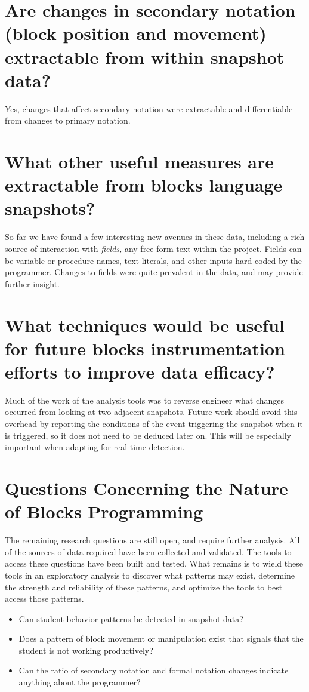 \section{Are changes in secondary notation (block position and movement) extractable from within snapshot data?}
Yes, changes that affect secondary notation were extractable and differentiable from changes to primary notation.

\section{What other useful measures are extractable from blocks language snapshots?}
So far we have found a few interesting new avenues in these data, including a rich source of interaction with \emph{fields,} any free-form text within the project. Fields can be variable or procedure names, text literals, and other inputs hard-coded by the programmer. Changes to fields were quite prevalent in the data, and may provide further insight.

\section{What techniques would be useful for future blocks instrumentation efforts to improve data efficacy?}
Much of the work of the analysis tools was to reverse engineer what changes occurred from looking at two adjacent snapshots. Future work should avoid this overhead by reporting the conditions of the event triggering the snapshot when it is triggered, so it does not need to be deduced later on. This will be especially important when adapting for real-time detection.

\section{Questions Concerning the Nature of Blocks Programming}
The remaining research questions are still open, and require further analysis. All of the sources of data required have been collected and validated. The tools to access these questions have been built and tested. What remains is to wield these tools in an exploratory analysis to discover what patterns may exist, determine the strength and reliability of these patterns, and optimize the tools to best access those patterns.
\begin{itemize}
\item Can student behavior patterns be detected in snapshot data?
\item Does a pattern of block movement or manipulation exist that signals that the student is not working productively?
\item Can the ratio of secondary notation and formal notation changes indicate anything about the programmer?
\end{itemize}

